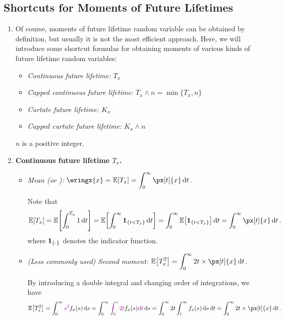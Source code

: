 \subsection{Shortcuts for Moments of Future Lifetimes}
\begin{enumerate}
\item Of course, moments of future lifetime random variable can be obtained by
definition, but usually it is not the most efficient approach. Here, we will
introduce some shortcut formulas for obtaining moments of various kinds of
future lifetime random variables:
\begin{itemize}
\item \emph{Continuous future lifetime:} \(T_x\)
\item \emph{Capped continuous future lifetime:} \(T_x\wedge n=\min\{T_x,n\}\)
\item \emph{Curtate future lifetime:} \(K_x\)
\item \emph{Capped curtate future lifetime:} \(K_x\wedge n\)
\end{itemize}
\begin{note}
\(n\) is a positive integer.
\end{note}

\item\label{it:tx-mom} \textbf{Continuous future lifetime \(T_x\).}
\begin{itemize}
\item \emph{Mean (or ):} \(\displaystyle
\eringx{x}=\expv{T_x}=\int_{0}^{\infty}\px[t]{x}\dd{t}\).

\begin{pf}
Note that
\[
\expv{T_x}=\expv{\int_{0}^{T_x}1\dd{t}}
=\expv{\int_{0}^{\infty}\indicset{t<T_x}\dd{t}}
=\int_{0}^{\infty}\expv{\indicset{t<T_x}}\dd{t}
=\int_{0}^{\infty}\px[t]{x}\dd{t}.
\]
where \(\mathbf{1}_{\left\{\cdot\right\}}\) denotes the indicator function.
\end{pf}
\item \emph{(Less commonly used) Second moment:} \(\displaystyle
\expv{T_x^2}=\int_{0}^{\infty}2t\times \px[t]{x}\dd{t}\).

\begin{pf}
By introducing a double integral and changing order of integrations, we have
\[
\expv{T_x^2}=\int_{0}^{\infty}\vc{s^2}f_x(s)\dd{s}
=\int_{0}^{\infty}\vc{\int_{0}^{s}2t}f_x(s)\vc{\dd{t}}\dd{s}
=\int_{0}^{\infty}2t\int_{t}^{\infty}f_x(s)\dd{s}\dd{t}
=\int_{0}^{\infty}2t\times \px[t]{x}\dd{t}.
\]
\end{pf}
\end{itemize}


\end{enumerate}
